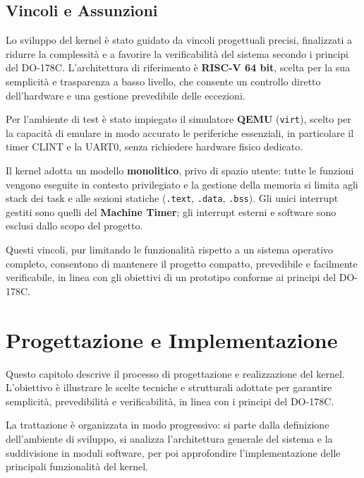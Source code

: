 \documentclass[italian, Lau, oneside]{sapthesis} %
\begin{document}
\section{Vincoli e Assunzioni}

Lo sviluppo del kernel è stato guidato da vincoli progettuali precisi, finalizzati a ridurre la complessità e a favorire la verificabilità del sistema secondo i principi del DO-178C.  
L’architettura di riferimento è \textbf{RISC-V 64 bit}, scelta per la sua semplicità e trasparenza a basso livello, che consente un controllo diretto dell’hardware e una gestione prevedibile delle eccezioni.

Per l’ambiente di test è stato impiegato il simulatore \textbf{QEMU} (\texttt{virt}), scelto per la capacità di emulare in modo accurato le periferiche essenziali, in particolare il timer CLINT e la UART0, senza richiedere hardware fisico dedicato.

Il kernel adotta un modello \textbf{monolitico}, privo di spazio utente: tutte le funzioni vengono eseguite in contesto privilegiato e la gestione della memoria si limita agli stack dei task e alle sezioni statiche (\texttt{.text}, \texttt{.data}, \texttt{.bss}).  
Gli unici interrupt gestiti sono quelli del \textbf{Machine Timer}; gli interrupt esterni e software sono esclusi dallo scopo del progetto.

Questi vincoli, pur limitando le funzionalità rispetto a un sistema operativo completo, consentono di mantenere il progetto compatto, prevedibile e facilmente verificabile, in linea con gli obiettivi di un prototipo conforme ai principi del DO-178C.

\chapter*{Progettazione e Implementazione}
\label{cap:3}

Questo capitolo descrive il processo di progettazione e realizzazione del kernel.  
L’obiettivo è illustrare le scelte tecniche e strutturali adottate per garantire semplicità, prevedibilità e verificabilità, in linea con i principi del DO-178C.  

La trattazione è organizzata in modo progressivo: si parte dalla definizione dell’ambiente di sviluppo, si analizza l’architettura generale del sistema e la suddivisione in moduli software, per poi approfondire l’implementazione delle principali funzionalità del kernel.
\end{document}
